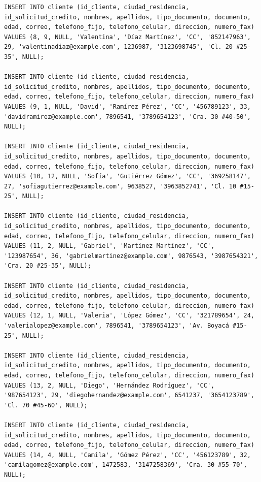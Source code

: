 \documentclass{article}
\begin{document}
\begin{lstlisting}
INSERT INTO cliente (id_cliente, ciudad_residencia, id_solicitud_credito, nombres, apellidos, tipo_documento, documento, edad, correo, telefono_fijo, telefono_celular, direccion, numero_fax)
VALUES (8, 9, NULL, 'Valentina', 'Díaz Martínez', 'CC', '852147963', 29, 'valentinadiaz@example.com', 1236987, '3123698745', 'Cl. 20 #25-35', NULL);

INSERT INTO cliente (id_cliente, ciudad_residencia, id_solicitud_credito, nombres, apellidos, tipo_documento, documento, edad, correo, telefono_fijo, telefono_celular, direccion, numero_fax)
VALUES (9, 1, NULL, 'David', 'Ramírez Pérez', 'CC', '456789123', 33, 'davidramirez@example.com', 7896541, '3789654123', 'Cra. 30 #40-50', NULL);

INSERT INTO cliente (id_cliente, ciudad_residencia, id_solicitud_credito, nombres, apellidos, tipo_documento, documento, edad, correo, telefono_fijo, telefono_celular, direccion, numero_fax)
VALUES (10, 12, NULL, 'Sofía', 'Gutiérrez Gómez', 'CC', '369258147', 27, 'sofiagutierrez@example.com', 9638527, '3963852741', 'Cl. 10 #15-25', NULL);

INSERT INTO cliente (id_cliente, ciudad_residencia, id_solicitud_credito, nombres, apellidos, tipo_documento, documento, edad, correo, telefono_fijo, telefono_celular, direccion, numero_fax)
VALUES (11, 2, NULL, 'Gabriel', 'Martínez Martínez', 'CC', '123987654', 36, 'gabrielmartinez@example.com', 9876543, '3987654321', 'Cra. 20 #25-35', NULL);

INSERT INTO cliente (id_cliente, ciudad_residencia, id_solicitud_credito, nombres, apellidos, tipo_documento, documento, edad, correo, telefono_fijo, telefono_celular, direccion, numero_fax)
VALUES (12, 1, NULL, 'Valeria', 'López Gómez', 'CC', '321789654', 24, 'valerialopez@example.com', 7896541, '3789654123', 'Av. Boyacá #15-25', NULL);

INSERT INTO cliente (id_cliente, ciudad_residencia, id_solicitud_credito, nombres, apellidos, tipo_documento, documento, edad, correo, telefono_fijo, telefono_celular, direccion, numero_fax)
VALUES (13, 2, NULL, 'Diego', 'Hernández Rodríguez', 'CC', '987654123', 29, 'diegohernandez@example.com', 6541237, '3654123789', 'Cl. 70 #45-60', NULL);

INSERT INTO cliente (id_cliente, ciudad_residencia, id_solicitud_credito, nombres, apellidos, tipo_documento, documento, edad, correo, telefono_fijo, telefono_celular, direccion, numero_fax)
VALUES (14, 4, NULL, 'Camila', 'Gómez Pérez', 'CC', '456123789', 32, 'camilagomez@example.com', 1472583, '3147258369', 'Cra. 30 #55-70', NULL);


\end{lstlisting}
\end{document}
